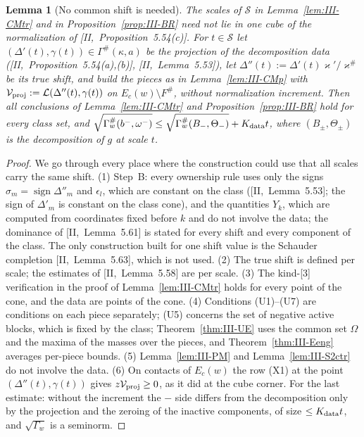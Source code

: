 \documentclass[10pt]{amsart}
\newtheorem{lemma}[theorem]{Lemma}
\theoremstyle{definition}
\theoremstyle{remark}
\newcommand{\sgn}{\operatorname{sign}}
\begin{document}
\begin{lemma}[No common shift is needed]\label{lem:III-nocube}
The scales of $\mathcal S$ in Lemma~\textup{\ref{lem:III-CMtr}} and in
Proposition~\textup{\ref{prop:III-BR}} need not lie in one cube of the normalization of
[II,~Proposition~5.54(c)].  For $t\in\mathcal S$ let $(\Delta'(t),\gamma(t))\in
\Gamma^\#(\kappa,a)$ be the projection of the decomposition data
\textup{(}[II,~Proposition~5.54(a),(b)], [II,~Lemma~5.53]\textup{)}, let $\Delta''(t)
:=\Delta'(t)\varkappa'/\varkappa^\#$ be its true shift, and build the pieces as in
Lemma~\textup{\ref{lem:III-CMp}} with $\mathcal V_{\rm proj}:=\mathcal L(\Delta''(t),
\gamma(t))$ on $E_c(w)\setminus F^\#$, without normalization increment.  Then all
conclusions of Lemma~\textup{\ref{lem:III-CMtr}} and
Proposition~\textup{\ref{prop:III-BR}} hold for every class set, and
$\sqrt{\Gamma^\#_w(b^-,\omega^-)}\le\sqrt{\Gamma^\#_w(B_-,\Theta_-)}+K_{\rm data}t$,
where $(B_\pm,\Theta_\pm)$ is the decomposition of $g$ at scale $t$.
\end{lemma}

\begin{proof}
We go through every place where the construction could use that all scales
carry the same shift.  (1) Step~B: every ownership rule uses only the signs
$\sigma_m=\sgn\Delta''_m$ and $\epsilon_l$, which are constant on the class
([II,~Lemma~5.53]; the sign of $\Delta'_m$ is constant on the class cone), and
the quantities $Y_k$, which are computed from coordinates fixed before $k$ and
do not involve the data; the dominance of [II,~Lemma~5.61] is stated for every
shift and every component of the class.  The only construction built for one
shift value is the Schauder completion [II,~Lemma~5.63], which is not used.
(2) The true shift is defined per scale; the estimates of [II,~Lemma~5.58] are
per scale.  (3) The kind-[3] verification in the proof of
Lemma~\ref{lem:III-CMtr} holds for every point of the cone, and the data are
points of the cone.  (4) Conditions (U1)--(U7) are conditions on each piece
separately; (U5) concerns the set of negative active blocks, which is fixed by
the class; Theorem~\ref{thm:III-UE} uses the common set $\Omega$ and the
maxima of the masses over the pieces, and Theorem~\ref{thm:III-Eeng} averages
per-piece bounds.  (5) Lemma~\ref{lem:III-PM} and Lemma~\ref{lem:III-S2ctr} do
not involve the data.  (6) On contacts of $E_c(w)$ the row (X1) at the point
$(\Delta''(t),\gamma(t))$ gives $z\mathcal V_{\rm proj}\ge0$, as it did at the cube
corner.  For the last estimate: without the increment the $-$ side differs
from the decomposition only by the projection and the zeroing of the inactive
components, of size $\le K_{\rm data}t$, and $\sqrt{\Gamma_w}$ is a seminorm.
\end{proof}
\end{document}
